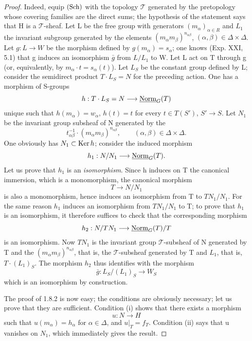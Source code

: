 \begin{proof}
Indeed, equip $\textup{(Sch)}$ with the topology $\mathcal T$ generated by the pretopology whose covering families are the direct sums; the hypothesis of the statement says that H is a $\mathcal T$-sheaf. Let L be the free group with generators $(m_\alpha)_{\alpha\in R}$ and $L_1$ the invariant subgroup generated by the elements $(m_\alpha m_\beta)^{n_{\alpha\beta}}$, $(\alpha,\beta)\in\Delta\times\Delta$.
Let $g:L\to W$ be the morphism defined by $g(m_\alpha)=s_\alpha$; one knows (Exp. XXI, 5.1) that g induces an isomorphism $\bar g$ from $L/L_1$ to W. Let L act on T through g (or, equivalently, by $m_\alpha\cdot t=s_\alpha(t)$). Let $L_S$ be the constant group defined by L; consider the semidirect product $T\cdot L_S=N$ for the preceding action. One has a morphism of S-groups
\[
h:T\cdot L_S=N\longrightarrow\underline{\mathrm{Norm}}_G(T)
\]
unique such that $h(m_\alpha)=w_\alpha$, $h(t)=t$ for every $t\in T(S')$, $S'\to S$. Let $N_1$ be the invariant group subsheaf of N generated by the
\[
t_{\alpha\beta}^{-1}\cdot(m_\alpha m_\beta)^{n_{\alpha\beta}},\qquad(\alpha,\beta)\in\Delta\times\Delta.
\]
One obviously has $N_1\subset\operatorname{Ker} h$; consider the induced morphism
\[
h_1:N/N_1\longrightarrow\underline{\mathrm{Norm}}_G(T).
\]
Let us prove that $h_1$ is an \emph{isomorphism}. Since h induces on T the canonical immersion, which is a monomorphism, the canonical morphism
\[
T\to N/N_1
\]
is also a monomorphism, hence induces an isomorphism from T to $TN_1/N_1$. For the same reason $h_1$ induces an isomorphism from $TN_1/N_1$ to T; to prove that $h_1$ is an isomorphism, it therefore suffices to check that the corresponding morphism
\[
h_2:N/TN_1\longrightarrow\underline{\mathrm{Norm}}_G(T)/T
\]
is an isomorphism. Now $TN_1$ is the invariant group $\mathcal T$-subsheaf of N generated by T and the $(m_\alpha m_\beta)^{n_{\alpha\beta}}$, that is, the $\mathcal T$-subsheaf generated by T and $L_1$, that is, $T\cdot(L_1)_S$. The morphism $h_2$ thus identifies with the morphism
\[
\bar g:L_S/(L_1)_S\to W_S
\]
which is an isomorphism by construction.

The proof of 1.8.2 is now easy; the conditions are obviously necessary; let us prove that they are sufficient. Condition (i) shows that there exists a morphism
\[
u:N\to H
\]
such that $u(m_\alpha)=h_\alpha$ for $\alpha\in\Delta$, and $u|_T=f_T$. Condition (ii) says that u vanishes on $N_1$, which immediately gives the result.
\end{proof}

